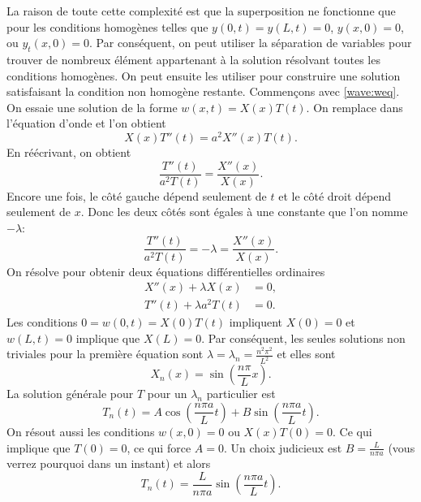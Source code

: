 La raison de toute cette complexité est que la superposition ne fonctionne que pour les
conditions homogènes telles que
$y(0,t) = y(L,t) = 0$, $y(x,0) = 0$,  ou $y_t(x,0) = 0$.  Par conséquent,
on peut utiliser la séparation de variables pour trouver de nombreux élément appartenant à la
solution résolvant toutes les conditions homogènes.  On peut  ensuite les utiliser pour
construire une solution satisfaisant la condition non homogène restante.
Commençons avec  \eqref{wave:weq}.
On essaie une solution de la forme $w(x,t) = X(x) T(t)$.  On remplace dans l'équation d'onde et l'on obtient 
\begin{equation*}
X(x)T''(t) = a^2 X''(x) T(t) .
\end{equation*}
En réécrivant,  on obtient 
\begin{equation*}
\frac{T''(t)}{a^2 T(t)} = \frac{X''(x)}{X(x)} .
\end{equation*}
Encore une fois, le côté gauche dépend seulement de $ t $ et le côté droit dépend
seulement de $ x $.  Donc les deux côtés sont égales à une constante que l'on nomme
$-\lambda$:
\begin{equation*}
\frac{T''(t)}{a^2 T(t)} = -\lambda = \frac{X''(x)}{X(x)} .
\end{equation*}
On résolve pour obtenir deux équations différentielles ordinaires
\begin{align*}
X''(x) + \lambda X(x) &= 0 , \\
T''(t) + \lambda a^2 T(t) &= 0 .
\end{align*}
Les conditions $0 = w(0,t) = X(0) T(t)$ impliquent $X(0) = 0$ et
$w(L,t) = 0$ implique que $X(L) = 0$.  Par conséquent,  les seules solutions non triviales
 pour la première équation sont 
$\lambda = \lambda_n = \frac{n^2 \pi^2}{L^2}$ et elles sont
\begin{equation*}
X_n(x) = \sin \left( \frac{n \pi}{L} x \right) .
\end{equation*}
La solution générale pour $T$ pour un $\lambda_n$ particulier est  
\begin{equation*}
T_n(t) = A \cos \left( \frac{n \pi a}{L} t \right)
+ B \sin \left( \frac{n \pi a}{L} t \right).
\end{equation*}
On résout aussi les conditions $w(x,0) = 0$ ou $X(x)T(0) = 0$.  Ce qui implique que $T(0) = 0$,  ce qui force $A = 0$.  Un choix judicieux est $B=\frac{L}{n \pi a}$ (vous verrez pourquoi dans un instant)
et alors
\begin{equation*}
T_n(t) = \frac{L}{n \pi a} \sin \left( \frac{n \pi a}{L} t \right).
\end{equation*}
